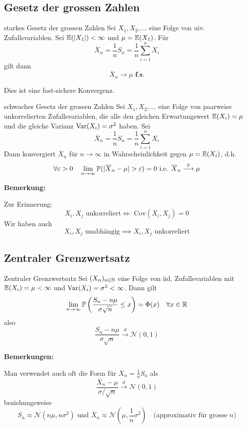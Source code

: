 \subsection{Gesetz der grossen Zahlen}
\begin{mainbox}{starkes Gesetz der grossen Zahlen}
    Sei $X_1, X_2, \ldots$ eine Folge von uiv. Zufallsvariablen. Sei $\mathbb{E}(|X_1|)<\infty$ und $\mu = \mathbb{E}(X_1)$. Für
    $$\overline{X}_n = \frac{1}{n}S_n = \frac{1}{n}\sum_{i = 1}^{n}X_i$$
    gilt dann
    $$\overline{X}_n \longrightarrow \mu \textbf{ f.s.}$$
\end{mainbox}
Dies ist eine fast-sichere Konvergenz.
\begin{mainbox}{schwaches Gesetz der grossen Zahlen}
    Sei $X_1, X_2, ...$ eine Folge von paarweise unkorrelierten Zufallsvariablen, die alle den gleichen Erwartungswert $\mathbb{E}(X_i) = \mu$ und die gleiche Varianz $\text{Var}(X_i) = \sigma^2$ haben.
    Sei 
    $$\overline{X}_n = \frac{1}{n}S_n = \frac{1}{n}\sum_{i = 1}^{n}X_i$$
    Dann konvergiert $\overline{X}_n$ für $n \to \infty$ in Wahrscheinlichkeit gegen $\mu = \mathbb{E}(X_i)$, d.h.
    $$\forall \varepsilon > 0 \quad \lim_{n\to \infty} \mathbb{P}(|\overline{X}_n - \mu| > \varepsilon) = 0 \text{ i.e. } \overline{X}_n \overset{\mathbb{P}}{\longrightarrow} \mu$$
\end{mainbox}
\textbf{Bemerkung: }

Zur Erinnerung: 
$$X_i, X_j \text{ unkorreliert} \iff \text{ Cov}(X_i, X_j) = 0$$
Wir haben auch 
$$X_i, X_j \text{ unabhängig} \implies X_i, X_j \text{ unkorreliert}$$

\subsection{Zentraler Grenzwertsatz}
\begin{mainbox}{Zentraler Grenzwertsatz}
    Sei $(X_n)_{n\in \mathbb{N}}$ eine Folge von iid. Zufallsvariablen mit $\mathbb{E}(X_i) = \mu < \infty$ und $\text{Var}(X_i) = \sigma^2 < \infty$.
    Dann gilt 
    $$\lim_{n\to \infty} \mathbb{P}\left(\frac{S_n - n \mu}{\sigma \sqrt{n}} \leq x\right) = \Phi(x) \quad \forall x \in \mathbb{R}$$
    also
    $$\frac{S_n - n \mu}{\sigma \sqrt{n}} \overset{d}{\longrightarrow} \mathcal{N}(0,1)$$
\end{mainbox}
\textbf{Bemerkungen: }

Man verwendet auch oft die Form für $\overline{X}_n = \frac{1}{n}S_n$ als
$$\frac{\overline{X}_n - \mu}{\sigma / \sqrt{n}} \overset{d}{\longrightarrow} \mathcal{N}(0,1)$$
beziehungsweise
$$S_n \approx \mathcal{N}(n\mu, n \sigma^2) \text{ und } \overline{X}_n \approx \mathcal{N}\left(\mu, \frac{1}{n}\sigma^2\right) \quad \text{(approximativ für grosse } n)$$
